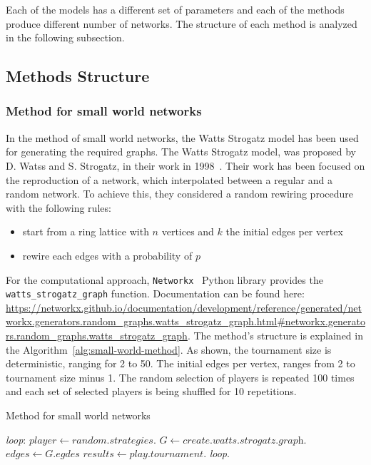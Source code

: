 Each of the models has a different set of parameters and each of the methods
produce different number of networks. The structure of each method is analyzed in
the following subsection.

\subsection{Methods Structure}
\label{sub:experiments-structure}
\subsubsection{Method for small world networks}

In the method of small world networks, the Watts Strogatz model has been used
for generating the required graphs.
The Watts Strogatz model, was proposed by D. Watss and S. Strogatz,
in their work in 1998~\cite{Watts1998}. Their work has been focused on the reproduction
of a network, which interpolated between a regular and a random network.
To achieve this, they considered a random rewiring procedure with the following
rules:

\begin{itemize}
	\item start from a ring lattice with \(n\) vertices and \(k\) the initial edges per vertex
	\item rewire each edges with a probability of \(p\)
\end{itemize}

For the computational approach, \texttt{Networkx}~\cite{networkx} Python library provides the
\texttt{watts\_strogatz\_graph} function. Documentation can be found here:
\url{https://networkx.github.io/documentation/development/reference/generated/networkx.generators.random_graphs.watts_strogatz_graph.html#networkx.generators.random_graphs.watts_strogatz_graph}.
The method's structure is explained
in the Algorithm~\ref{alg:small-world-method}. As shown, the tournament size is
deterministic, ranging for 2 to 50. The initial edges per vertex, ranges from 2
to tournament size minus 1. The random selection of players is repeated 100 times
and each set of selected players is being shuffled for 10 repetitions.

\begin{algorithm}
	\caption{Method for small world networks}\label{alg:small-world-method}
	\begin{algorithmic}
		\BState \emph{loop}:
		\State $player \gets \textit{random.strategies}$.
		\State $G \gets \textit{create.watts.strogatz.graph}$.
		\State $edges \gets \textit{G.egdes}$
		\State $results \gets \textit{play.tournament}$.
		\emph{loop}.
		\EndFor
		\EndFor
		\EndFor
		\EndFor
		\EndProcedure
	\end{algorithmic}
\end{algorithm}


